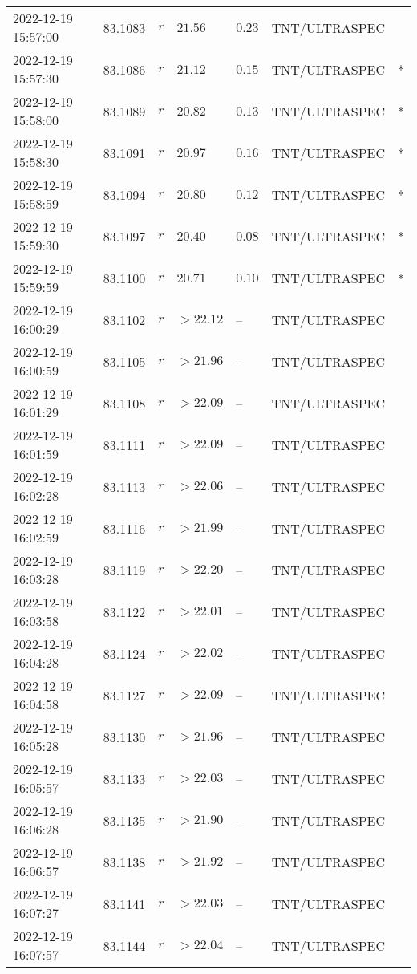 \documentclass{nature_plusfigure}
\begin{document}
\begin{supplement}
\begin{center}
\begin{longtable}{lllllll}
2022-12-19 15:57:00 & 83.1083 & $r$ & $21.56$ & $0.23$ & TNT/ULTRASPEC &  \\ 
2022-12-19 15:57:30 & 83.1086 & $r$ & $21.12$ & $0.15$ & TNT/ULTRASPEC & * \\ 
2022-12-19 15:58:00 & 83.1089 & $r$ & $20.82$ & $0.13$ & TNT/ULTRASPEC & * \\ 
2022-12-19 15:58:30 & 83.1091 & $r$ & $20.97$ & $0.16$ & TNT/ULTRASPEC & * \\ 
2022-12-19 15:58:59 & 83.1094 & $r$ & $20.80$ & $0.12$ & TNT/ULTRASPEC & * \\ 
2022-12-19 15:59:30 & 83.1097 & $r$ & $20.40$ & $0.08$ & TNT/ULTRASPEC & * \\ 
2022-12-19 15:59:59 & 83.1100 & $r$ & $20.71$ & $0.10$ & TNT/ULTRASPEC & * \\ 
2022-12-19 16:00:29 & 83.1102 & $r$ & $>22.12$ & -- & TNT/ULTRASPEC &  \\ 
2022-12-19 16:00:59 & 83.1105 & $r$ & $>21.96$ & -- & TNT/ULTRASPEC &  \\ 
2022-12-19 16:01:29 & 83.1108 & $r$ & $>22.09$ & -- & TNT/ULTRASPEC &  \\ 
2022-12-19 16:01:59 & 83.1111 & $r$ & $>22.09$ & -- & TNT/ULTRASPEC &  \\ 
2022-12-19 16:02:28 & 83.1113 & $r$ & $>22.06$ & -- & TNT/ULTRASPEC &  \\ 
2022-12-19 16:02:59 & 83.1116 & $r$ & $>21.99$ & -- & TNT/ULTRASPEC &  \\ 
2022-12-19 16:03:28 & 83.1119 & $r$ & $>22.20$ & -- & TNT/ULTRASPEC &  \\ 
2022-12-19 16:03:58 & 83.1122 & $r$ & $>22.01$ & -- & TNT/ULTRASPEC &  \\ 
2022-12-19 16:04:28 & 83.1124 & $r$ & $>22.02$ & -- & TNT/ULTRASPEC &  \\ 
2022-12-19 16:04:58 & 83.1127 & $r$ & $>22.09$ & -- & TNT/ULTRASPEC &  \\ 
2022-12-19 16:05:28 & 83.1130 & $r$ & $>21.96$ & -- & TNT/ULTRASPEC &  \\ 
2022-12-19 16:05:57 & 83.1133 & $r$ & $>22.03$ & -- & TNT/ULTRASPEC &  \\ 
2022-12-19 16:06:28 & 83.1135 & $r$ & $>21.90$ & -- & TNT/ULTRASPEC &  \\ 
2022-12-19 16:06:57 & 83.1138 & $r$ & $>21.92$ & -- & TNT/ULTRASPEC &  \\ 
2022-12-19 16:07:27 & 83.1141 & $r$ & $>22.03$ & -- & TNT/ULTRASPEC &  \\ 
2022-12-19 16:07:57 & 83.1144 & $r$ & $>22.04$ & -- & TNT/ULTRASPEC &  \\ 

\end{longtable}
\end{center}
\end{supplement}
\end{document}
